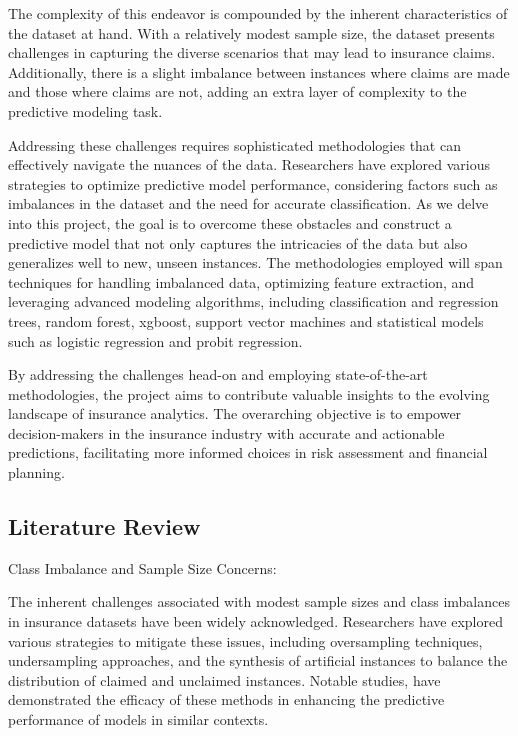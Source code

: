 \documentclass[
]{article}
\begin{document}
The complexity of this endeavor is compounded by the inherent
characteristics of the dataset at hand. With a relatively modest sample
size, the dataset presents challenges in capturing the diverse scenarios
that may lead to insurance claims. Additionally, there is a slight
imbalance between instances where claims are made and those where claims
are not, adding an extra layer of complexity to the predictive modeling
task.

Addressing these challenges requires sophisticated methodologies that
can effectively navigate the nuances of the data. Researchers have
explored various strategies to optimize predictive model performance,
considering factors such as imbalances in the dataset and the need for
accurate classification. As we delve into this project, the goal is to
overcome these obstacles and construct a predictive model that not only
captures the intricacies of the data but also generalizes well to new,
unseen instances. The methodologies employed will span techniques for
handling imbalanced data, optimizing feature extraction, and leveraging
advanced modeling algorithms, including classification and regression
trees, random forest, xgboost, support vector machines and statistical
models such as logistic regression and probit regression.

By addressing the challenges head-on and employing state-of-the-art
methodologies, the project aims to contribute valuable insights to the
evolving landscape of insurance analytics. The overarching objective is
to empower decision-makers in the insurance industry with accurate and
actionable predictions, facilitating more informed choices in risk
assessment and financial planning.

\newpage

\hypertarget{literature-review}{%
\subsection{Literature Review}\label{literature-review}}

Class Imbalance and Sample Size Concerns:

The inherent challenges associated with modest sample sizes and class
imbalances in insurance datasets have been widely acknowledged.
Researchers have explored various strategies to mitigate these issues,
including oversampling techniques, undersampling approaches, and the
synthesis of artificial instances to balance the distribution of claimed
and unclaimed instances. Notable studies, have demonstrated the efficacy
of these methods in enhancing the predictive performance of models in
similar contexts.
\end{document}
